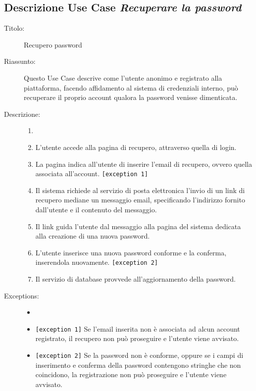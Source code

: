 \documentclass[11pt, a4paper]{article}
\theoremstyle{definition} %
\begin{document}
\subsection*{Descrizione Use Case \textit{Recuperare la password}}
\begin{description}
    \item[Titolo:] Recupero password
    
    \item[Riassunto:] Questo Use Case descrive come l'utente anonimo e
    registrato alla piattaforma, facendo affidamento al sistema di credenziali
    interno, può recuperare il proprio account qualora la password venisse dimenticata.

    \item[Descrizione:]
    \begin{enumerate}
        \item[]
        \item L'utente accede alla pagina di recupero, attraverso quella di login.
        \item La pagina indica all'utente di inserire l'email di recupero, ovvero quella associata all'account. \verb|[exception 1]|
        \item Il sistema richiede al servizio di posta elettronica l'invio di un link di recupero mediane un messaggio email, specificando l'indirizzo fornito dall'utente e il contenuto del messaggio.
        \item Il link guida l'utente dal messaggio alla pagina del sistema dedicata alla creazione di una nuova password.
        \item L'utente inserisce una nuova password conforme e la conferma, inserendola nuovamente. \verb|[exception 2]|
        \item Il servizio di database provvede all'aggiornamento della password.
    \end{enumerate}
    
    \item[Exceptions:]
    \begin{itemize}
        \item[]
        \item \verb|[exception 1]| Se l'email inserita non è associata ad alcun account registrato, il recupero non può proseguire e l'utente viene avvisato.
        \item \verb|[exception 2]| Se la password non è conforme, oppure se i campi di inserimento e conferma della password contengono stringhe che non coincidono, la registrazione non può proseguire e l'utente viene avvisato.
    \end{itemize}
    
\end{description}
\end{document}
